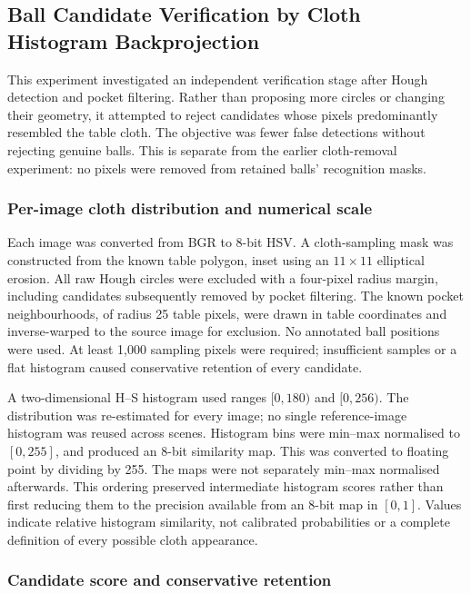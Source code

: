 \subsection{Ball Candidate Verification by Cloth Histogram Backprojection}
\label{sec:backprojection}

This experiment investigated an independent verification stage after Hough
detection and pocket filtering. Rather than proposing more circles or changing
their geometry, it attempted to reject candidates whose pixels predominantly
resembled the table cloth. The objective was fewer false detections without
rejecting genuine balls. This is separate from the earlier cloth-removal
experiment: no pixels were removed from retained balls' recognition masks.

\subsubsection{Per-image cloth distribution and numerical scale}

Each image was converted from BGR to 8-bit HSV. A cloth-sampling mask was
constructed from the known table polygon, inset using an $11\times11$
elliptical erosion. All raw Hough circles were excluded with a four-pixel
radius margin, including candidates subsequently removed by pocket filtering.
The known pocket neighbourhoods, of radius 25 table pixels, were drawn in
table coordinates and inverse-warped to the source image for exclusion.
No annotated ball positions were used. At least 1,000 sampling pixels were
required; insufficient samples or a flat histogram caused conservative
retention of every candidate.

A two-dimensional H--S histogram used ranges $[0,180)$ and $[0,256)$.
The distribution was re-estimated for every image; no single reference-image
histogram was reused across scenes. Histogram bins were min--max normalised
to $[0,255]$, and  produced an 8-bit similarity
map. This was converted to floating point by dividing by 255. The maps were
not separately min--max normalised afterwards. This ordering preserved
intermediate histogram scores rather than first reducing them to the
precision available from an 8-bit map in $[0,1]$. Values indicate relative
histogram similarity, not calibrated probabilities or a complete definition
of every possible cloth appearance.

\subsubsection{Candidate score and conservative retention}

